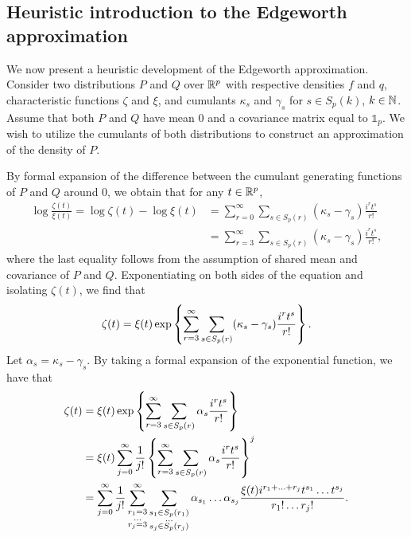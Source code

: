 \subsection{Heuristic introduction to the Edgeworth approximation} \label{sec-edgeworth}

We now present a heuristic development of the Edgeworth approximation. Consider two distributions $P$ and $Q$ over ${\mathbb{R}^p}$ with respective densities $f$ and $q$, characteristic functions $\zeta$ and $\xi$, and cumulants $\kappa_s$ and $\gamma_s$ for $s \in S_p(k)$, $k \in \mathbb{N}$. Assume that both $P$ and $Q$ have mean $0$ and a covariance matrix equal to $\mathbb{1}_p$. We wish to utilize the cumulants of both distributions to construct an approximation of the density of $P$.

By formal expansion of the difference between the cumulant generating functions of $P$ and $Q$ around 0, we obtain that for any $t \in {\mathbb{R}^p}$,
\begin{align*}
    \log \frac{\zeta(t)}{\xi(t)}
    = \log \zeta(t) - \log \xi(t) 
    &= \sum_{r=0}^\infty \sum_{s \in S_p(r)} (\kappa_s - \gamma_s)\frac{i^r t^s}{r!}\\
    &= \sum_{r=3}^\infty \sum_{s \in S_p(r)} (\kappa_s - \gamma_s)\frac{i^r t^s}{r!},
\end{align*}
where the last equality follows from the assumption of shared mean and covariance of $P$ and $Q$. Exponentiating on both sides of the equation and isolating $\zeta(t)$, we find that
\begin{equation*}
    \zeta(t) = \xi(t)\exp\left\{\sum_{r=3}^\infty \sum_{s \in S_p(r)} (\kappa_s - \gamma_s)\frac{i^r t^s}{r!}\right\}.
\end{equation*}
Let $\alpha_s = \kappa_s - \gamma_s$. By taking a formal expansion of the exponential function, we have that
\begin{align*}
    \zeta(t)
    &= \xi(t)\exp\left\{\sum_{r=3}^\infty \sum_{s \in S_p(r)} \alpha_s\frac{i^r t^s}{r!}\right\}\\
    &= \xi(t)\sum_{j=0}^\infty \frac{1}{j!} \left\{\sum_{r=3}^\infty \sum_{s \in S_p(r)} \alpha_s\frac{i^r t^s}{r!}\right\}^j \\
    &=
    \sum_{j=0}^\infty \frac{1}{j!} 
    \sum_{\substack{r_1 = 3\\ \ldots \\r_j = 3}}^\infty
    \sum_{\substack{s_1 \in S_p(r_1)\\ \ldots \\s_j \in S_p(r_j)}}
    \alpha_{s_1}\ldots\alpha_{s_j}
    \frac{
        \xi(t) i^{r_1 + \ldots + r_j}
        t^{s_1} \ldots t^{s_j}
    }{
        r_1! \ldots r_j!
    }.
\end{align*}
